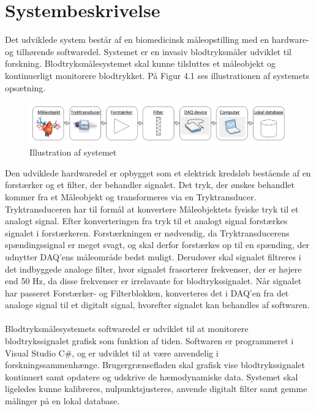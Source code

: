 \chapter{Systembeskrivelse}
Det udviklede system består af en biomedicinsk måleopstilling med en hardware- og tilhørende softwaredel. Systemet er en invasiv blodtryksmåler udviklet til forskning. Blodtryksmålesystemet skal kunne tilsluttes et måleobjekt og kontinuerligt monitorere blodtrykket. På Figur 4.1 ses illustrationen af systemets opsætning.  

\begin{figure}[H]
	\centering
	\includegraphics[width=1\textwidth]{Figurer/Snip20151209_73}
	\caption{Illustration af systemet}
\end{figure}

Den udviklede hardwaredel er opbygget som et elektrisk kredsløb bestående af en forstærker og et filter, der behandler signalet. Det tryk, der ønskes behandlet kommer fra et Måleobjekt og transformeres via en Tryktransducer. Tryktransduceren har til formål at konvertere Måleobjektets fysiske tryk til et analogt signal. Efter konverteringen fra tryk til et analogt signal forstærkes signalet i forstærkeren. Forstærkningen er nødvendig, da Tryktransducerens spændingssignal er meget svagt, og skal derfor forstærkes op til en spænding, der udnytter DAQ'ens måleområde bedst muligt. Derudover skal signalet filtreres i det indbyggede analoge filter, hvor signalet frasorterer frekvenser, der er højere end 50 Hz, da disse frekvenser er irrelavante for blodtrykssignalet. Når signalet har passeret Forstærker- og Filterblokken, konverteres det i DAQ’en fra det analoge signal til et digitalt signal, hvorefter signalet kan behandles af softwaren. \\\\
Blodtryksmålesystemets softwaredel er udviklet til at monitorere blodtrykssignalet grafisk som funktion af tiden. Softwaren er programmeret i Visual Studio C\#, og er udviklet til at være anvendelig i forskningssammenhænge. Brugergrænsefladen skal grafisk vise blodtrykssignalet kontinuert samt opdatere og udskrive de hæmodynamiske data. Systemet skal ligeledes kunne kalibreres, nulpunktsjusteres, anvende digitalt filter samt gemme målinger på en lokal database. 
